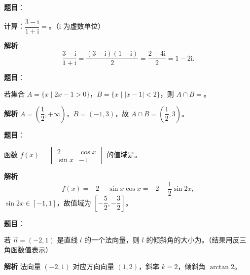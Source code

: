
\begin{answer}

\textbf{题目}：

计算：$\dfrac{3-\mathrm i}{1+\mathrm i}=$\gkblank{}。（$\mathrm i$ 为虚数单位）

\textbf{解析}
\nopagebreak[4]
\[\frac{3-\mathrm i}{1+\mathrm i}=\frac{(3-\mathrm i)(1-\mathrm i)}2=\frac{2-4\mathrm i}2=1-2\mathrm i.\]


\end{answer}
\begin{answer}

\textbf{题目}：

若集合 $A=\{x\mid2x-1>0\}$，$B=\{x\mid|x-1|<2\}$，则 $A\cap B=$\gkblank{}。

\textbf{解析}
$A=\left(\dfrac12,+\infty\right)$，$B=(-1,3)$，故 $A\cap B=\left(\dfrac12,3\right)$。


\end{answer}
\begin{answer}

\textbf{题目}：

函数 $f(x)=\begin{vmatrix}2&\cos x\\ \sin x&-1\end{vmatrix}$ 的值域是\gkblank{}。

\textbf{解析}
\nopagebreak[4]
\[f(x)=-2-\sin x\cos x=-2-\frac12\sin2x,\]
$\sin2x\in[-1,1]$，故值域为 $\left[-\dfrac52,-\dfrac32\right]$。


\end{answer}
\begin{answer}

\textbf{题目}：

若 $\overrightarrow n=(-2,1)$ 是直线 $l$ 的一个法向量，则 $l$ 的倾斜角的大小为\gkblank{}。（结果用反三角函数值表示）

\textbf{解析}
法向量 $(-2,1)$ 对应方向向量 $(1,2)$，斜率 $k=2$，倾斜角 $\arctan2$。


\end{answer}
